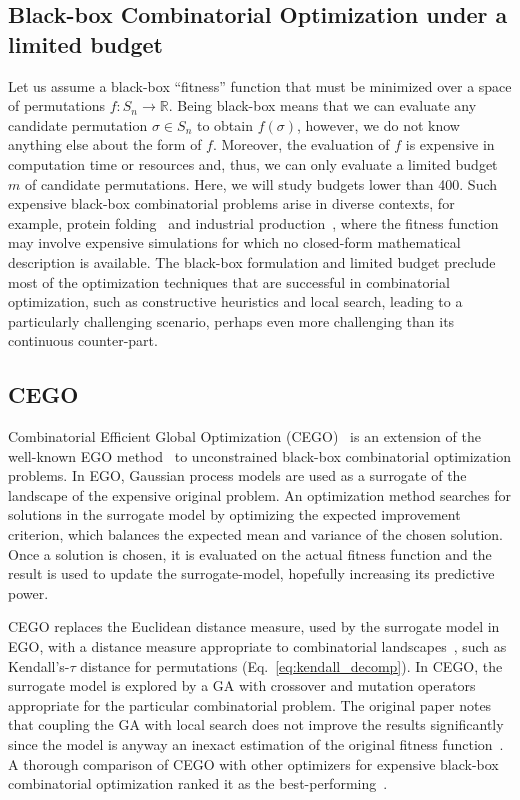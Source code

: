 \documentclass[runningheads]{llncs}
\newcommand{\FEmax}{\ensuremath{m}}
\begin{document}
\subsection{Black-box Combinatorial Optimization under a limited budget}

Let us assume a black-box ``fitness'' function that must be minimized over a
space of permutations $f\colon S_n \to \mathbb{R}$. Being black-box means that
we can evaluate any candidate permutation $\sigma \in S_n$ to obtain
$f(\sigma)$, however, we do not know anything else about the form of
$f$. Moreover, the evaluation of $f$ is expensive in computation time or
resources and, thus, we can only evaluate a limited budget $\FEmax$ of candidate
permutations. Here, we will study budgets lower than 400. Such expensive
black-box combinatorial problems arise in diverse contexts, for example,
protein folding~\citep{RomKraArn2012protein} and industrial
production~\citep{FerAlvDiaIglEna2014ants}, where the fitness function may
involve expensive simulations for which no closed-form mathematical description
is available. The black-box formulation and limited budget preclude most of the
optimization techniques that are successful in combinatorial optimization, such
as constructive  heuristics and local search, leading to
a particularly challenging scenario, perhaps even more challenging than its continuous
counter-part.

\subsection{CEGO}

Combinatorial Efficient Global Optimization
(CEGO)~\citep{ZaeStoFriFisNauBar2014} is an extension of the well-known EGO
method~\citep{JonSchWel98go} to unconstrained black-box combinatorial
optimization problems. In EGO, Gaussian process models are used as a surrogate
of the landscape of the expensive original problem. An optimization method
searches for solutions in the surrogate model by optimizing the expected
improvement criterion, which balances the expected mean and variance of the
chosen solution. Once a solution is chosen, it is evaluated on the actual
fitness function and the result is used to update the surrogate-model,
hopefully increasing its predictive power.

CEGO replaces the Euclidean distance measure, used by the surrogate model in
EGO, with a distance measure appropriate to combinatorial
landscapes~\citep{ZaeStoBar2014:ppsn}, such as Kendall's-$\tau$ distance for
permutations (Eq.~\ref{eq:kendall_decomp}). In CEGO, the surrogate model is
explored by a GA with crossover and mutation operators appropriate for the
particular combinatorial problem. The original paper notes that coupling the GA
with local search does not improve the results significantly since the model is
anyway an inexact estimation of the original fitness
function~\citep[p.~875]{ZaeStoFriFisNauBar2014}. A thorough comparison of CEGO
with other optimizers for expensive black-box combinatorial optimization ranked
it as the best-performing~\citep{ZaeStoFriFisNauBar2014}.
\end{document}
